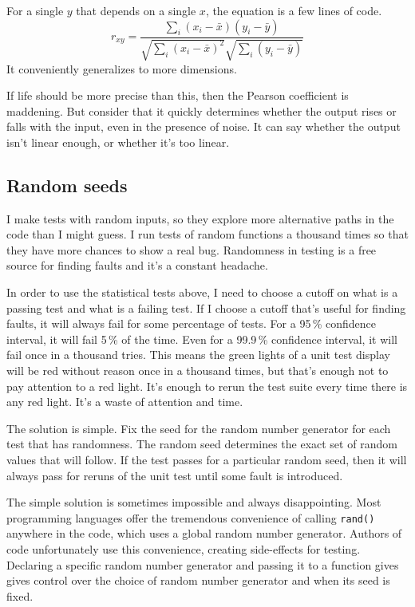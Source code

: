 \documentclass[fleqn,10pt]{olplainarticle}
\begin{document}
For a single $y$ that depends on a single $x$, the equation
is a few lines of code.
\begin{equation}
r_{xy} = \frac{\sum_i (x_i - \bar{x})(y_i - \bar{y})}{\sqrt{\sum_i (x_i - \bar{x})^2}\sqrt{\sum_i(y_i - \bar{y})}}
\end{equation}
It conveniently generalizes to more dimensions.

If life should be more precise than this, then the Pearson
coefficient is maddening. But consider that it quickly
determines whether the output rises or falls with the input,
even in the presence of noise. It can say whether the output
isn't linear enough, or whether it's too linear.


\subsection{Random seeds}

I make tests with random inputs, so they explore more alternative
paths in the code than I might guess. I run tests of random
functions a thousand times so that they have more chances to
show a real bug. Randomness in testing is a free source for
finding faults and it's a constant headache.

In order to use the statistical tests above, I need to choose
a cutoff on what is a passing test and what is a failing test.
If I choose a cutoff that's useful for finding faults, it will
always fail for some percentage of tests. For a 95\,\% confidence
interval, it will fail 5\,\% of the time. Even for a
99.9\,\% confidence interval, it will fail once in a thousand
tries. This means the green lights of a unit test display will
be red without reason once in a thousand times, but that's
enough not to pay attention to a red light. It's enough to
rerun the test suite every time there is any red light.
It's a waste of attention and time.

The solution is simple. Fix the seed for the random number
generator for each test that has randomness. The random
seed determines the exact set of random values that will
follow. If the test passes for a particular random seed,
then it will always pass for reruns of the unit test until
some fault is introduced.

The simple solution is sometimes impossible and always
disappointing. Most programming languages offer the tremendous
convenience of calling \lstinline!rand()! anywhere in the
code, which uses a global random number generator. Authors
of code unfortunately use this convenience, creating side-effects
for testing. Declaring a specific random number generator
and passing it to a function gives gives control over the
choice of random number generator and when its seed is fixed.
\end{document}
